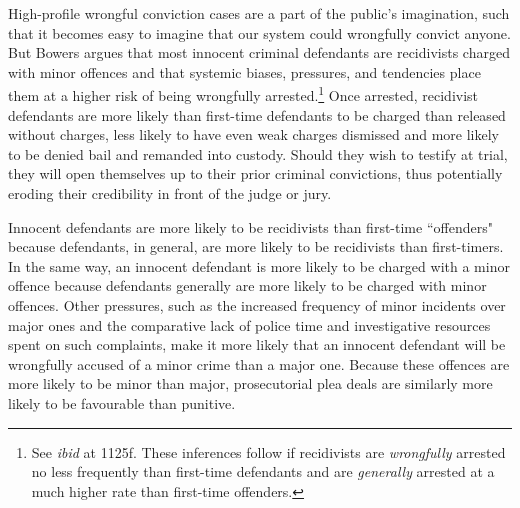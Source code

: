 High-profile wrongful conviction cases are a part of the public's imagination, such that it becomes easy to imagine that our system could wrongfully convict anyone. But Bowers argues that most innocent criminal defendants are recidivists charged with minor offences and that systemic biases, pressures, and tendencies place them at a higher risk of being wrongfully arrested.\footnote{See \textit{ibid} at 1125f. These inferences follow if recidivists are \textit{wrongfully} arrested no less frequently than first-time defendants and are \textit{generally} arrested at a much higher rate than first-time offenders.} Once arrested, recidivist defendants are more likely than first-time defendants to be charged than released without charges, less likely to have even weak charges dismissed and more likely to be denied bail and remanded into custody. Should they wish to testify at trial, they will open themselves up to their prior criminal convictions, thus potentially eroding their credibility in front of the judge or jury. 

Innocent defendants are more likely to be recidivists than first-time ``offenders" because defendants, in general, are more likely to be recidivists than first-timers. In the same way, an innocent defendant is more likely to be charged with a minor offence because defendants generally are more likely to be charged with minor offences. Other pressures, such as the increased frequency of minor incidents over major ones and the comparative lack of police time and investigative resources spent on such complaints, make it more likely that an innocent defendant will be wrongfully accused of a minor crime than a major one. Because these offences are more likely to be minor than major, prosecutorial plea deals are similarly more likely to be favourable than punitive.

